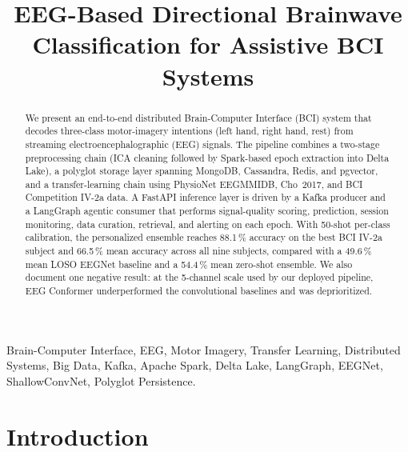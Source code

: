 \documentclass[conference]{IEEEtran}
\begin{document}
\title{EEG-Based Directional Brainwave Classification
for Assistive BCI Systems}

\author{
\and
{}
\and
{}
}

\maketitle

\begin{abstract}
We present an end-to-end distributed Brain-Computer
Interface (BCI) system that decodes three-class motor-imagery intentions
(left hand, right hand, rest) from streaming electroencephalographic (EEG)
signals. The pipeline combines a two-stage preprocessing chain (ICA cleaning
followed by Spark-based epoch extraction into Delta Lake), a polyglot storage
layer spanning MongoDB, Cassandra, Redis, and pgvector, and a transfer-learning
chain using PhysioNet EEGMMIDB, Cho~2017, and BCI Competition IV-2a data. A
FastAPI inference layer is driven by a Kafka producer and a LangGraph agentic
consumer that performs signal-quality scoring, prediction, session monitoring,
data curation, retrieval, and alerting on each epoch. With 50-shot per-class
calibration, the personalized ensemble reaches 88.1\,\% accuracy on the best
BCI IV-2a subject and 66.5\,\% mean accuracy across all nine subjects, compared
with a 49.6\,\% mean LOSO EEGNet baseline and a 54.4\,\% mean zero-shot
ensemble. We also document one negative result: at the 5-channel scale used by
our deployed pipeline, EEG Conformer underperformed the convolutional baselines
and was deprioritized.
\end{abstract}

\begin{IEEEkeywords}
Brain-Computer Interface, EEG, Motor Imagery, Transfer Learning, Distributed
Systems, Big Data, Kafka, Apache Spark, Delta Lake, LangGraph, EEGNet,
ShallowConvNet, Polyglot Persistence.
\end{IEEEkeywords}

\section{Introduction}
\end{document}
